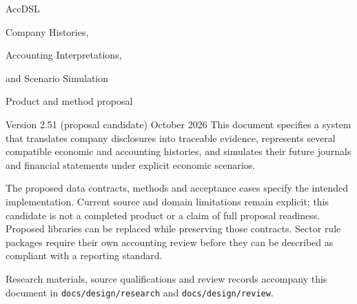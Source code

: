 \documentclass[11pt,a4paper]{report}
\newcommand{\code}[1]{\texttt{#1}}
\begin{document}
\hypersetup{pageanchor=false}
\begin{titlepage}
\vspace*{20mm}
{\sffamily\color{ink}\Huge AccDSL\par}
\vspace{7mm}
{\LARGE Company Histories,\par Accounting Interpretations,\par and Scenario Simulation\par}
\vspace{12mm}
{\Large Product and method proposal\par}
\vspace{5mm}
Version 2.51 (proposal candidate)  October 2026
\vfill
This document specifies a system that translates company disclosures into
traceable evidence, represents several compatible economic and accounting
histories, and simulates their future journals and financial statements under
explicit economic scenarios.

The proposed data contracts, methods and acceptance cases specify the intended
implementation. Current source and domain limitations remain explicit; this
candidate is not a completed product or a claim of full proposal readiness. Proposed libraries can be replaced while preserving those
contracts. Sector rule packages require their own accounting review before
they can be described as compliant with a reporting standard.

\vspace{8mm}
Research materials, source qualifications and review records accompany this
document in \code{docs/design/research} and \code{docs/design/review}.
\end{titlepage}
\hypersetup{pageanchor=true}
\tableofcontents
\clearpage{}














\appendix




\begingroup\raggedright

\endgroup
\end{document}
